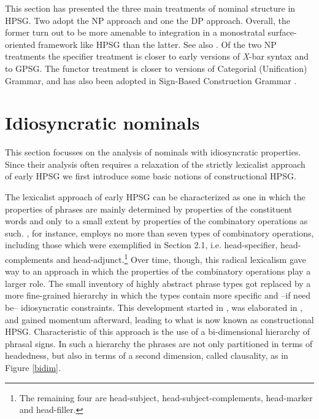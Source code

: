 \documentclass[output=paper]{langsci/langscibook}
\begin{document}
This section has presented the three main treatments of nominal structure in HPSG. 
Two adopt the NP approach and one the DP approach.
Overall, the former turn out to be more amenable to integration  
in a monostratal surface-oriented framework like HPSG than the latter. 
See also \citet{Mueller19}. Of the two NP treatments
the specifier treatment is closer to early versions of {\it X}-bar syntax and to GPSG.   
The functor treatment is closer to versions of Categorial (Unification) Grammar, and 
has also been adopted in Sign-Based Construction Grammar \citep{Sag2012}.
 

\section{Idiosyncratic nominals}


This section focusses on the analysis of nominals with idiosyncratic properties. 
Since their analysis often requires 
a relaxation of the strictly lexicalist approach of early HPSG we first introduce some basic 
notions of constructional HPSG. 

The lexicalist approach of early HPSG can be characterized as one in which the 
properties of phrases are mainly determined by properties of the constituent words 
and only to a small extent by properties of the combinatory operations as such. 
\citet[391]{PS94}, for instance, employs no more than seven types 
of combinatory operations, including those which were exemplified in Section 2.1, 
i.e. head-specifier, head-complements and head-adjunct.\footnote{The remaining four 
are head-subject, head-subject-complements, head-marker and head-filler.}   
Over time, though, this radical lexicalism gave way to an 
approach in which the properties of the combinatory operations  
play a larger role. The small inventory of highly 
abstract phrase types got replaced by a more fine-grained hierarchy  
in which the types contain more specific and --if need be-- idiosyncratic 
constraints. This development started in \citet{Sag97}, was 
elaborated in \citet{GS00}, and gained momentum afterward,
leading to what is now known as constructional HPSG. 
Characteristic of this approach is the use of a bi-dimensional hierarchy 
of phrasal signs. In such a hierarchy the phrases are not only partitioned 
in terms of {\sc headedness}, but also in terms of a second dimension, called  
{\sc clausality}, as in Figure \ref{bidim}. 
\end{document}
